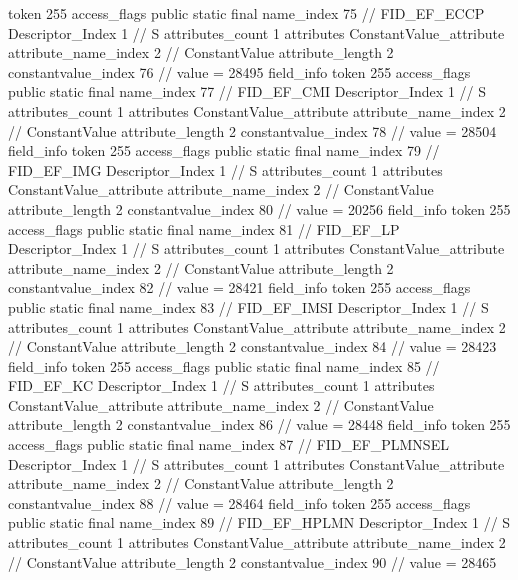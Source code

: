 {{{{{				token	255
				access_flags	public static final
				name_index	75		// FID_EF_ECCP
				Descriptor_Index	1		// S
				attributes_count	1
				attributes {
				ConstantValue_attribute {
					attribute_name_index	2		// ConstantValue
					attribute_length	2
					constantvalue_index	76		// value = 28495
				}
				}
			}
			field_info {
				token	255
				access_flags	public static final
				name_index	77		// FID_EF_CMI
				Descriptor_Index	1		// S
				attributes_count	1
				attributes {
				ConstantValue_attribute {
					attribute_name_index	2		// ConstantValue
					attribute_length	2
					constantvalue_index	78		// value = 28504
				}
				}
			}
			field_info {
				token	255
				access_flags	public static final
				name_index	79		// FID_EF_IMG
				Descriptor_Index	1		// S
				attributes_count	1
				attributes {
				ConstantValue_attribute {
					attribute_name_index	2		// ConstantValue
					attribute_length	2
					constantvalue_index	80		// value = 20256
				}
				}
			}
			field_info {
				token	255
				access_flags	public static final
				name_index	81		// FID_EF_LP
				Descriptor_Index	1		// S
				attributes_count	1
				attributes {
				ConstantValue_attribute {
					attribute_name_index	2		// ConstantValue
					attribute_length	2
					constantvalue_index	82		// value = 28421
				}
				}
			}
			field_info {
				token	255
				access_flags	public static final
				name_index	83		// FID_EF_IMSI
				Descriptor_Index	1		// S
				attributes_count	1
				attributes {
				ConstantValue_attribute {
					attribute_name_index	2		// ConstantValue
					attribute_length	2
					constantvalue_index	84		// value = 28423
				}
				}
			}
			field_info {
				token	255
				access_flags	public static final
				name_index	85		// FID_EF_KC
				Descriptor_Index	1		// S
				attributes_count	1
				attributes {
				ConstantValue_attribute {
					attribute_name_index	2		// ConstantValue
					attribute_length	2
					constantvalue_index	86		// value = 28448
				}
				}
			}
			field_info {
				token	255
				access_flags	public static final
				name_index	87		// FID_EF_PLMNSEL
				Descriptor_Index	1		// S
				attributes_count	1
				attributes {
				ConstantValue_attribute {
					attribute_name_index	2		// ConstantValue
					attribute_length	2
					constantvalue_index	88		// value = 28464
				}
				}
			}
			field_info {
				token	255
				access_flags	public static final
				name_index	89		// FID_EF_HPLMN
				Descriptor_Index	1		// S
				attributes_count	1
				attributes {
				ConstantValue_attribute {
					attribute_name_index	2		// ConstantValue
					attribute_length	2
					constantvalue_index	90		// value = 28465
}}}}}}}
